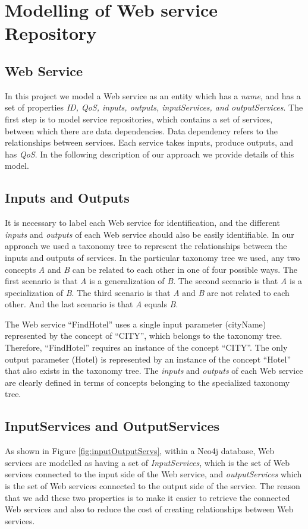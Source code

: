 \section{Modelling of Web service Repository} \label{procesedGD}
\subsection {Web Service}
In this project we model a Web service as an entity which has a \emph{name}, and has a set of properties \emph{ID, QoS, inputs, outputs, inputServices, and outputServices}. The first step is to model service repositories, which contains a set of services, between which there are data dependencies. Data dependency refers to the relationships between services. Each service takes inputs, produce outputs, and has \emph{QoS}. In the following description of our approach we provide details of this model.\par
\subsection {Inputs and Outputs}
It is necessary to label each Web service for identification, and the different \emph{inputs} and  \emph{outputs} of each Web service should also be easily identifiable. In our approach we used a taxonomy tree to represent the relationships between the inputs and outputs of services. In the particular taxonomy tree we used, any two concepts \emph{A} and \emph{B} can be related to each other in one of four possible ways. The first scenario is that \emph{A} is a generalization of \emph{B}. The second scenario is that \emph{A} is a specialization of \emph{B}. The third scenario is that \emph{A} and \emph{B} are not related to each other. And the last scenario is that  \emph{A} equals \emph{B}. 
\newcommand{\quotes}[1]{``#1''}
\begin{example}[Example 3.1]
\noindent
The Web service \quotes{FindHotel} uses a single input parameter (cityName) represented by the concept of \quotes{CITY}, which belongs to the taxonomy tree. Therefore, \quotes{FindHotel} requires an instance of the concept \quotes{CITY}. The only output parameter (Hotel) is represented by an instance of the concept \quotes{Hotel} that also exists in the taxonomy tree. The \emph{inputs} and \emph{outputs} of each Web service are clearly defined in terms of concepts belonging to the specialized taxonomy tree.
\end{example}


\subsection {InputServices and OutputServices}
As shown in Figure \ref{fig:inputOutputServs}, within a Neo4j database, Web services are modelled as having a set of \emph{InputServices}, which is the set of Web services connected to the input side of the Web service, and  \emph{outputServices} which is the set of Web services connected to the output side of the service. The reason that we add these two properties is to make it easier to retrieve the connected Web services and also to reduce the cost of creating relationships between Web services. \par


